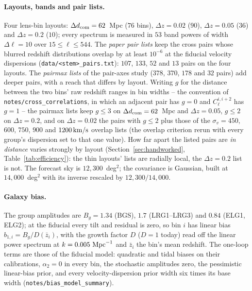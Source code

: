 \documentclass[11pt]{article}
\newcommand{\kms}{\,{\rm km/s}}
\newcommand{\dcom}{$\Delta d_{\rm com} = 62$~Mpc}
\newcommand{\us}{\_\allowbreak}
\begin{document}
\paragraph{Layouts, bands and pair lists.}
Four lens-bin layouts: \dcom{} ($76$ bins), $\Delta z = 0.02$ ($90$),
$\Delta z = 0.05$ ($36$) and $\Delta z = 0.2$ ($10$); every spectrum
is measured in $53$ band powers of width $\Delta\ell = 10$ over
$15 \le \ell \le 544$.  The \emph{paper pair lists} keep the cross
pairs whose blurred redshift distributions overlap by at least
$10^{-6}$ at the fiducial velocity dispersions
(\texttt{data/<stem>\us pairs.txt}): $107$, $133$, $52$ and $13$
pairs on the four layouts.  The \emph{pairmax lists} of the pair-axes
study ($378$, $370$, $178$ and $32$ pairs) add deeper pairs, with a
reach that differs by layout.  Writing $g$ for the distance between
the two bins' raw redshift ranges in bin widths -- the convention of
\texttt{notes/cross\us correlations}, in which an adjacent pair has
$g = 0$ and $C_\ell^{i,i+2}$ has $g = 1$ -- the pairmax lists keep
$g \le 3$ on \dcom{} and $\Delta z = 0.05$, $g \le 2$ on
$\Delta z = 0.2$, and on $\Delta z = 0.02$ the pairs with $g \le 2$
plus those of the $\sigma_v = 450$, $600$, $750$, $900$ and
$1200\kms$ overlap lists (the overlap criterion rerun with every
group's dispersion set to that one value).  How far apart the listed pairs are
\emph{in distance} varies strongly by layout
(Section~\ref{sec:handworked}, Table~\ref{tab:efficiency}): the thin
layouts' lists are radially local, the $\Delta z = 0.2$ list is not.
The forecast sky is
$12{,}300$~deg$^2$; the covariance is Gaussian, built at
$14{,}000$~deg$^2$ with its inverse rescaled by $12{,}300/14{,}000$.

\paragraph{Galaxy bias.}
The group amplitudes are $B_g = 1.34$ (BGS), $1.7$ (LRG1--LRG3) and
$0.84$ (ELG1, ELG2); at the fiducial every tilt and residual is zero,
so bin $i$ has linear bias $b_{1,i} = B_g/D(\bar{z}_i)$, with the
growth factor $D$ ($D = 1$ today) read off the linear power spectrum
at $k = 0.005~{\rm Mpc}^{-1}$ and $\bar{z}_i$ the bin's mean redshift.
The one-loop terms are those of the fiducial model: quadratic and
tidal biases on their calibrations, $\alpha_2 = 0$ in every bin, the
stochastic amplitudes zero, the pessimistic linear-bias prior, and
every velocity-dispersion prior width six times its base width
(\texttt{notes/bias\us model\us summary}).
\end{document}
